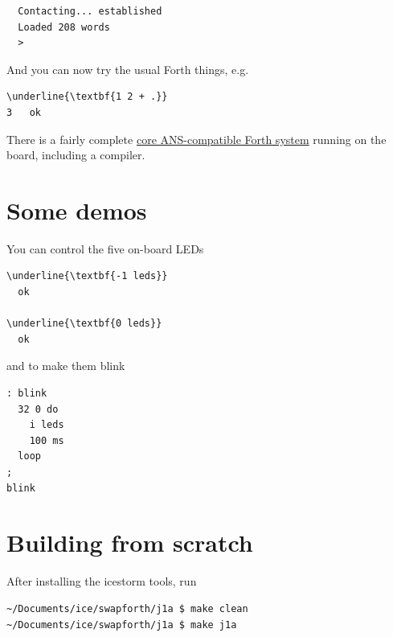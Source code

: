 \begin{framed}
\begin{Verbatim}
  Contacting... established
  Loaded 208 words
  >
\end{Verbatim}
\end{framed}

And you can now try the usual Forth things, e.g.

\begin{framed}
\begin{Verbatim}[commandchars=\\\{\}]
\underline{\textbf{1 2 + .}}
3   ok
\end{Verbatim}
\end{framed}

There is a fairly complete 
\href{http://forth.sourceforge.net/std/dpans/dpans6.htm}{core ANS-compatible Forth system}
running on the board, including a compiler.

\section{Some demos} 

You can control the five on-board LEDs 

\begin{framed}
\begin{Verbatim}[commandchars=\\\{\}]
\underline{\textbf{-1 leds}}
  ok

\underline{\textbf{0 leds}}
  ok
\end{Verbatim}
\end{framed}

\noindent
and to make them blink

\begin{framed}
\begin{Verbatim}[commandchars=\\\{\}]
: blink
  32 0 do
    i leds
    100 ms
  loop
;
blink
\end{Verbatim}
\end{framed}



\section{Building from scratch}

After installing the icestorm tools, run

\begin{Verbatim}
~/Documents/ice/swapforth/j1a $ make clean
~/Documents/ice/swapforth/j1a $ make j1a
\end{Verbatim}

